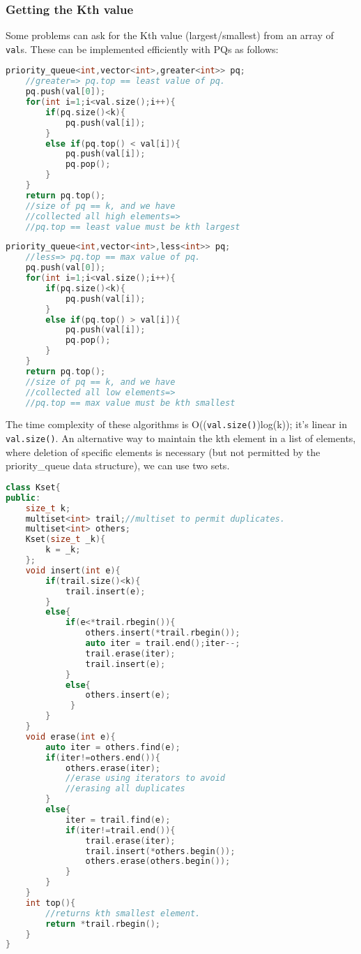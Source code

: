 \documentclass{article}
\begin{document}
\subsubsection{Getting the Kth value}
Some problems can ask for the Kth value (largest/smallest) from an
array of \texttt{val}s. These can be implemented
efficiently with PQs as follows:
\begin{lstlisting}[caption={Kth Largest Element},language=C++]
    priority_queue<int,vector<int>,greater<int>> pq;
    //greater=> pq.top == least value of pq.
    pq.push(val[0]);
    for(int i=1;i<val.size();i++){
        if(pq.size()<k){
            pq.push(val[i]);
        }
        else if(pq.top() < val[i]){
            pq.push(val[i]);
            pq.pop();
        }
    }
    return pq.top();
    //size of pq == k, and we have 
    //collected all high elements=>
    //pq.top == least value must be kth largest
\end{lstlisting}
\begin{lstlisting}[caption={Kth Smallest Element},language=C++]
    priority_queue<int,vector<int>,less<int>> pq;
    //less=> pq.top == max value of pq.
    pq.push(val[0]);
    for(int i=1;i<val.size();i++){
        if(pq.size()<k){
            pq.push(val[i]);
        }
        else if(pq.top() > val[i]){
            pq.push(val[i]);
            pq.pop();
        }
    }
    return pq.top();
    //size of pq == k, and we have 
    //collected all low elements=>
    //pq.top == max value must be kth smallest
\end{lstlisting}
The time complexity of these algorithms is
O((\texttt{val.size()})log(k)); it's linear in
\texttt{val.size()}.
An alternative way to maintain the kth element
in a list of elements, where deletion of specific
elements is necessary (but not permitted by the
priority\_queue data structure), we can use two sets.
\begin{lstlisting}[caption=Kth smallest Element,language=C++]
class Kset{
public:
    size_t k;
    multiset<int> trail;//multiset to permit duplicates.
    multiset<int> others;
    Kset(size_t _k){
        k = _k;
    };
    void insert(int e){
        if(trail.size()<k){
            trail.insert(e);
        }
        else{
            if(e<*trail.rbegin()){
                others.insert(*trail.rbegin());
                auto iter = trail.end();iter--;
                trail.erase(iter);
                trail.insert(e);
            }
            else{
                others.insert(e);
             }
        }
    }
    void erase(int e){
        auto iter = others.find(e);
        if(iter!=others.end()){
            others.erase(iter);
            //erase using iterators to avoid
            //erasing all duplicates
        }
        else{
            iter = trail.find(e);
            if(iter!=trail.end()){
                trail.erase(iter);
                trail.insert(*others.begin());
                others.erase(others.begin());
            }
        }
    }
    int top(){
        //returns kth smallest element.
        return *trail.rbegin();
    }
}
\end{lstlisting}
\end{document}
